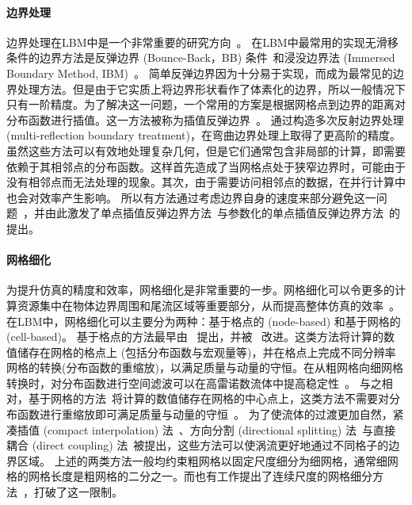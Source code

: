 \paragraph{边界处理}
边界处理在LBM中是一个非常重要的研究方向~\citep{Marson-2022}。
在LBM中最常用的实现无滑移条件的边界方法是反弹边界 (Bounce-Back，BB) 条件~\citep{Ladd-1994, Bouzidi-2001, Ginzburg-2003, Chun-2007}和浸没边界法 (Immersed Boundary Method, IBM)~\citep{Peskin-1972, Lu-2012, Kang-2011, Patel-2018, Seo-2011, Chen-2013}。
简单反弹边界因为十分易于实现，而成为最常见的边界处理方法。但是由于它实质上将边界形状看作了体素化的边界，所以一般情况下只有一阶精度。为了解决这一问题，一个常用的方案是根据网格点到边界的距离对分布函数进行插值。这一方法被称为插值反弹边界~\citep{Bouzidi-2001, Yu-2003}。
\citet{Ginzburg-2003} 通过构造多次反射边界处理 (multi-reflection boundary treatment)，在弯曲边界处理上取得了更高阶的精度。
虽然这些方法可以有效地处理复杂几何，但是它们通常包含非局部的计算，即需要依赖于其相邻点的分布函数。这样首先造成了当网格点处于狭窄边界时，可能由于没有相邻点而无法处理的现象。其次，由于需要访问相邻点的数据，在并行计算中也会对效率产生影响。
所以有方法通过考虑边界自身的速度来部分避免这一问题~\citep{Chun-2007}，并由此激发了单点插值反弹边界方法~\citep{Zhao-2017, Geier-2015, Tao-2018-b}与参数化的单点插值反弹边界方法~\citep{Zhao-2019, Chen-2021-b, Marson-2021}的提出。

\paragraph{网格细化}
为提升仿真的精度和效率，网格细化是非常重要的一步。网格细化可以令更多的计算资源集中在物体边界周围和尾流区域等重要部分，从而提高整体仿真的效率~\citep{Sandoval-2012}。在LBM中，网格细化可以主要分为两种：基于格点的 (node-based) 和基于网格的 (cell-based)。
基于格点的方法最早由~\citet{Filippova-1998} 提出，并被~\citet{Dupuis-2003} 改进。这类方法将计算的数值储存在网格的格点上 (包括分布函数与宏观量等)，并在格点上完成不同分辨率网格的转换(分布函数的重缩放)，以满足质量与动量的守恒。在从粗网格向细网格转换时，对分布函数进行空间滤波可以在高雷诺数流体中提高稳定性~\citep{Lagrava-2012}。
与之相对，基于网格的方法~\citep{Rohde-2006, Chen-2006}将计算的数值储存在网格的中心点上，这类方法不需要对分布函数进行重缩放即可满足质量与动量的守恒~\citep{Schornbaum-2016, Hasert-2014, Latt-2021}。
为了使流体的过渡更加自然，紧凑插值 (compact interpolation) 法~\citep{Fard-2015}、方向分割 (directional splitting) 法~\citep{Gendre-2017}与直接耦合 (direct coupling) 法~\citep{Astoul-2021}被提出，这些方法可以使涡流更好地通过不同格子的边界区域。
上述的两类方法一般均约束粗网格以固定尺度细分为细网格，通常细网格的网格长度是粗网格的二分之一。而也有工作提出了连续尺度的网格细分方法~\citep{Li-2019}，打破了这一限制。


